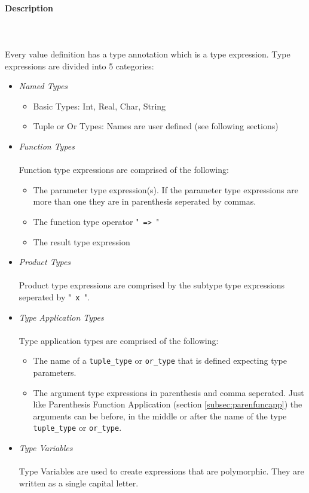 \documentclass{article}
\def\pend{\mbox{} \\\\}
\begin{document}
\paragraph{Description}\pend
Every value definition has a type annotation which is a type expression. 
Type expressions are divided into 5 categories:
\begin{itemize}
\item \textit{Named Types}

  \begin{itemize}
  \item Basic Types: Int, Real, Char, String

  \item Tuple or Or Types: Names are user defined (see following sections)
  \end{itemize}

\item \textit{Function Types}\\\\
Function type expressions are comprised of the following:

  \begin{itemize}
  \item
  The parameter type expression(s). If the parameter type expressions are more than
  one they are in parenthesis seperated by commas.

  \item
  The function type operator  "\texttt{ => }"

  \item
  The result type expression
  \end{itemize}

\item \textit{Product Types}\\\\
Product type expressions are comprised by the subtype type expressions seperated
by "\texttt{ x }".

\item \textit{Type Application Types}\\\\
Type application types are comprised of the following: 

  \begin{itemize}
  \item
  The name of a \texttt{tuple_type} or \texttt{or_type} that is defined expecting
  type parameters.

  \item
  The argument type expressions in parenthesis and comma seperated. Just like
  Parenthesis Function Application (section \ref{subsec:parenfuncapp}) the 
  arguments can be before, in the middle or after the name of the type
  \texttt{tuple_type} or \texttt{or_type}.

  \end{itemize}

\item \textit{Type Variables}\\\\
Type Variables are used to create expressions that are polymorphic.
They are written as a single capital letter.

\end{itemize}
\end{document}
